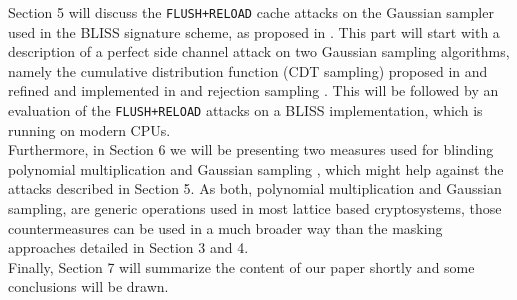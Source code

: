 Section 5 will discuss the \verb|FLUSH+RELOAD| cache attacks on the Gaussian sampler used in the BLISS signature scheme, as proposed in \cite{cryptoeprint:2016:300}. 
This part will start with a description of a perfect side channel attack on two Gaussian sampling algorithms, namely the cumulative distribution function (CDT sampling) proposed in \cite{cryptoeprint:2010:088} and refined and implemented in \cite{cryptoeprint:2014:254} and rejection sampling \cite{cryptoeprint:2013:383}. This will be followed by an evaluation of the \verb|FLUSH+RELOAD| attacks on a BLISS implementation, which is running on modern CPUs.\\
Furthermore, in Section 6 we will be presenting two measures used for blinding polynomial multiplication and Gaussian sampling \cite{cryptoeprint:2016:276}, which might help against the attacks described in Section 5. As both, polynomial multiplication and Gaussian sampling, are generic operations used in most lattice based cryptosystems, those countermeasures can be used in a much broader way than the masking approaches detailed in Section 3 and 4.\\
Finally, Section 7 will summarize the content of our paper shortly and some conclusions will be drawn.